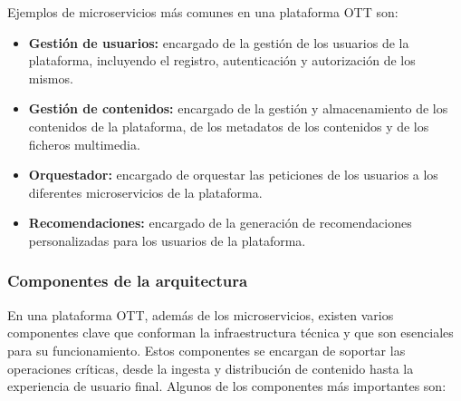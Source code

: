 Ejemplos de microservicios más comunes en una plataforma OTT son:
\begin{itemize}
\item \textbf{Gestión de usuarios:} encargado de la gestión de los usuarios de la plataforma,
incluyendo el registro, autenticación y autorización de los mismos. 
\item \textbf{Gestión de contenidos:} encargado de la gestión y almacenamiento de los contenidos de la plataforma,
de los metadatos de los contenidos y de los ficheros multimedia.
\item \textbf{Orquestador:} encargado de orquestar las peticiones de los usuarios a los diferentes microservicios
de la plataforma.
\item \textbf{Recomendaciones:} encargado de la generación de recomendaciones personalizadas para los usuarios
de la plataforma.
\end{itemize}


\subsubsection{Componentes de la arquitectura}
\label{subsec:fundamentos_teoricos_arquitectura_componentes}

En una plataforma OTT, además de los microservicios, existen varios componentes clave que conforman la 
infraestructura técnica y que son esenciales para su funcionamiento. Estos componentes se encargan de 
soportar las operaciones críticas, desde la ingesta y distribución de contenido hasta la experiencia de 
usuario final. Algunos de los componentes más importantes son:

